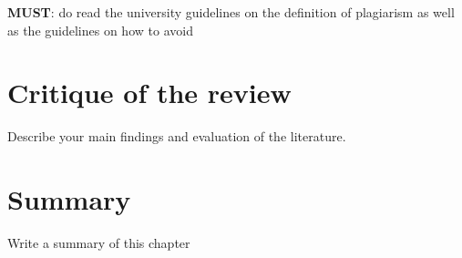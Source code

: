 \noindent
\textbf{\color{red}MUST}: do read the university guidelines on the
definition of plagiarism as well as the guidelines on how to avoid

\section{Critique of the review} %
Describe your main findings and evaluation of the literature. ~\\

\section{Summary}
Write a summary of this chapter~\\
